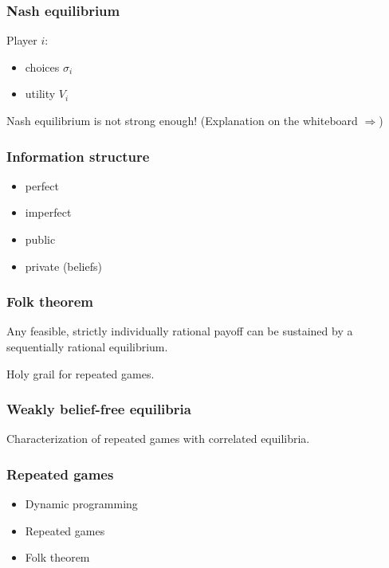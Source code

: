 \begin{frame}
  \frametitle{Nash equilibrium}

  Player $i$:
  \begin{itemize}
  \item choices $\sigma_i$
  \item utility $V_i$
  \end{itemize}

  \pause
  Nash equilibrium is not strong enough!
  (Explanation on the whiteboard {\Huge $\Rightarrow$})
\end{frame}

\begin{frame}
  \frametitle{Information structure}

  \pause
  \begin{itemize}
  \item perfect
  \item imperfect
  \end{itemize}

  \pause
  \begin{itemize}
  \item public
  \item private (beliefs)
  \end{itemize}

\end{frame}

\begin{frame}
  \frametitle{Folk theorem}

  Any feasible, strictly individually rational payoff can be sustained by a
  sequentially rational equilibrium.

  \pause
  \bigskip
  Holy grail for repeated games.
\end{frame}

\begin{frame}
  \begin{figure}
  \begin{tikzpicture}[scale=1,
                      axes/.style=,
                      payoffs/.style=,
                      feasible/.style={opacity=0.2}]
    
  \end{tikzpicture}
  \end{figure}
\end{frame}

\begin{framestruct}
\end{framestruct}

\begin{frame}
  \frametitle{Weakly belief-free equilibria}

  Characterization of repeated games with correlated equilibria.
\end{frame}


\begin{framestruct}
  \frametitle{Repeated games}

  \begin{itemize}
  \pause \item Dynamic programming
  \pause \item Repeated games
  \pause \item Folk theorem
  \end{itemize}

\end{framestruct}
